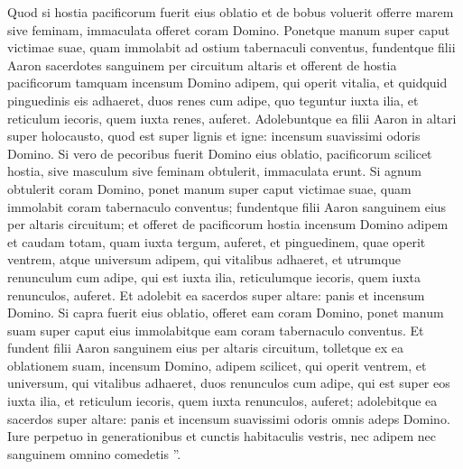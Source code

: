 \begin{biblechapter}
\begin{biblechapter}
\begin{biblechapter}
\verse Quod si hostia pacificorum fuerit eius oblatio et de bobus voluerit offerre marem sive feminam, immaculata offeret coram Domino. 
\verse Ponetque manum super caput victimae suae, quam immolabit ad ostium tabernaculi conventus, fundentque filii Aaron sacerdotes sanguinem per circuitum altaris 
\verse et offerent de hostia pacificorum tamquam incensum Domino adipem, qui operit vitalia, et quidquid pinguedinis eis adhaeret, 
\verse duos renes cum adipe, quo teguntur iuxta ilia, et reticulum iecoris, quem iuxta renes, auferet. 
\verse Adolebuntque ea filii Aaron in altari super holocausto, quod est super lignis et igne: incensum suavissimi odoris Domino.
 \verse Si vero de pecoribus fuerit Domino eius oblatio, pacificorum scilicet hostia, sive masculum sive feminam obtulerit, immaculata erunt. 
\verse Si agnum obtulerit coram Domino, 
\verse ponet manum super caput victimae suae, quam immolabit coram tabernaculo conventus; fundentque filii Aaron sanguinem eius per altaris circuitum; 
\verse et offeret de pacificorum hostia incensum Domino adipem et caudam totam, quam iuxta tergum, auferet, et pinguedinem, quae operit ventrem, atque universum adipem, qui vitalibus adhaeret, 
\verse et utrumque renunculum cum adipe, qui est iuxta ilia, reticulumque iecoris, quem iuxta renunculos, auferet. 
\verse Et adolebit ea sacerdos super altare: panis et incensum Domino.
 \verse Si capra fuerit eius oblatio, offeret eam coram Domino, 
\verse ponet manum suam super caput eius immolabitque eam coram tabernaculo conventus. Et fundent filii Aaron sanguinem eius per altaris circuitum, 
\verse tolletque ex ea oblationem suam, incensum Domino, adipem scilicet, qui operit ventrem, et universum, qui vitalibus adhaeret, 
\verse duos renunculos cum adipe, qui est super eos iuxta ilia, et reticulum iecoris, quem iuxta renunculos, auferet; 
 \verse adolebitque ea sacerdos super altare: panis et incensum suavissimi odoris omnis adeps Domino. 
\verse Iure perpetuo in generationibus et cunctis habitaculis vestris, nec adipem nec sanguinem omnino comedetis ”.
 

\end{biblechapter}
\end{biblechapter}
\end{biblechapter}
